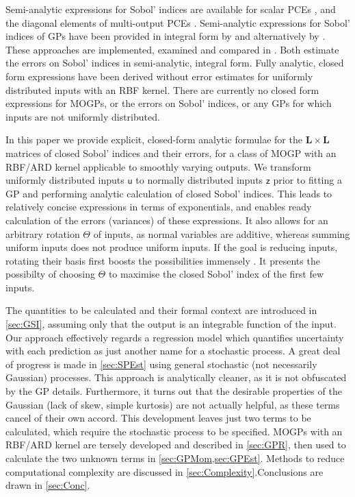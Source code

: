 \documentclass[preprint,12pt]{elsarticle}
\newcommand*{\x}{\times}
\newcommand*{\mi}[1]{\mathbf{#1}}
\newcommand*{\rv}[1]{\mathsf{#1}}
\begin{document}
    Semi-analytic expressions for Sobol' indices are available for scalar PCEs \cite{Sudret2008}, and the diagonal elements of multi-output PCEs \cite{GarciaCabrejo2014}.
    Semi-analytic expressions for Sobol' indices of GPs have been provided in integral form by \cite{Oakley.OHagan2004} and alternatively by \cite{Chen.etal2005}. These approaches are implemented, examined and compared in \cite{Marrel.etal2009,Srivastava.etal2017}. Both \cite{Oakley.OHagan2004,Marrel.etal2009} estimate the errors on Sobol' indices in semi-analytic, integral form. Fully analytic, closed form expressions have been derived without error estimates for uniformly distributed inputs \cite{Wu.etal2016a} with an RBF kernel. There are currently no closed form expressions for MOGPs, or the errors on Sobol' indices, or any GPs for which inputs are not uniformly distributed. 

    In this paper we provide explicit, closed-form analytic formulae for the $\mi{L}\x \mi{L}$ matrices of closed Sobol' indices and their errors, for a class of MOGP with an RBF/ARD kernel applicable to smoothly varying outputs. 
    We transform uniformly distributed inputs $\rv{u}$ to normally distributed inputs $\rv{z}$ prior to fitting a GP and performing analytic calculation of closed Sobol' indices. This leads to relatively concise expressions in terms of exponentials, and enables ready calculation of the errors (variances) of these expressions. It also allows for an arbitrary rotation $\Theta$ of inputs, as normal variables are additive, whereas summing uniform inputs does not produce uniform inputs. If the goal is reducing inputs, rotating their basis first boosts the possibilities immensely \cite{Constantine2015}. It presents the possibilty of choosing $\Theta$ to maximise the closed Sobol' index of the first few inputs.

    The quantities to be calculated and their formal context are introduced in \cref{sec:GSI}, assuming only that the output is an integrable function of the input. Our approach effectively regards a regression model which quantifies uncertainty with each prediction as just another name for a stochastic process. A great deal of progress is made in \cref{sec:SPEst} using general stochastic (not necessarily Gaussian) processes. This approach is analytically cleaner, as it is not obfuscated by the GP details. Furthermore, it turns out that the desirable properties of the Gaussian (lack of skew, simple kurtosis) are not actually helpful, as these terms cancel of their own accord. This development leaves just two terms to be calculated, which require the stochastic process to be specified. MOGPs with an RBF/ARD kernel are tersely developed and described in \cref{sec:GPR}, then used to calculate the two unknown terms in \cref{sec:GPMom,sec:GPEst}. Methods to reduce computational complexity are discussed in \cref{sec:Complexity}.Conclusions are drawn in \cref{sec:Conc}.
\end{document}
